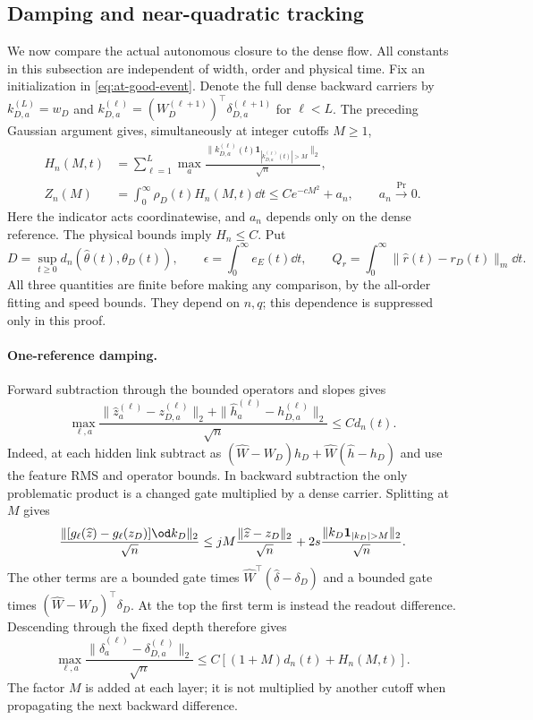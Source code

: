 \subsection{Damping and near-quadratic tracking}
\label{sec:at-tracking}

We now compare the actual autonomous closure to the dense flow.  All
constants in this subsection are independent of width, order and physical
time.  Fix an initialization in \eqref{eq:at-good-event}.  Denote the full
dense backward carriers by
$k^{(L)}_{D,a}=w_D$ and
$k^{(\ell)}_{D,a}=(W_D^{(\ell+1)})^\top\delta^{(\ell+1)}_{D,a}$
for $\ell<L$.  The preceding Gaussian argument gives, simultaneously at
integer cutoffs $M\ge1$,
\begin{align}
 H_n(M,t)&=\sum_{\ell=1}^L\max_a
 \frac{\|k^{(\ell)}_{D,a}(t)
                \mathbf1_{|k^{(\ell)}_{D,a}(t)|>M}\|_2}{\sqrt n},\nonumber\\
 Z_n(M)&=\int_0^\infty\rho_D(t)H_n(M,t)\dd t
       \le Ce^{-cM^2}+a_n,\qquad a_n\xrightarrow{\Pr}0.
 \label{eq:at-tracking-tail}
\end{align}
Here the indicator acts coordinatewise, and $a_n$ depends only on the dense
reference.  The physical bounds imply $H_n\le C$.  Put
\[
 D=\sup_{t\ge0}d_n(\widehat\theta(t),\theta_D(t)),\qquad
 \epsilon=\int_0^\infty e_E(t)\dd t,\qquad
 Q_r=\int_0^\infty\|\widehat r(t)-r_D(t)\|_m\dd t.
\]
All three quantities are finite before making any comparison, by the
all-order fitting and speed bounds.  They depend on $n,q$; this dependence
is suppressed only in this proof.

\paragraph{One-reference damping.}
Forward subtraction through the bounded operators and slopes gives
\[
 \max_{\ell,a}\frac{\|\widehat z_a^{(\ell)}-z_{D,a}^{(\ell)}\|_2
                 +\|\widehat h_a^{(\ell)}-h_{D,a}^{(\ell)}\|_2}{\sqrt n}
 \le C d_n(t).
\]
Indeed, at each hidden link subtract as
$(\widehat W-W_D)h_D+\widehat W(\widehat h-h_D)$ and use the feature
RMS and operator bounds.  In backward subtraction the only problematic
product is a changed gate multiplied by a dense carrier.  Splitting at $M$
gives
\begin{equation}
 \frac{\|[g_\ell(\widehat z)-g_\ell(z_D)]\od k_D\|_2}{\sqrt n}
 \le jM\frac{\|\widehat z-z_D\|_2}{\sqrt n}
       +2s\frac{\|k_D\mathbf1_{|k_D|>M}\|_2}{\sqrt n}.
 \label{eq:at-cutoff-product}
\end{equation}
The other terms are a bounded gate times
$\widehat W^\top(\widehat\delta-\delta_D)$ and a bounded gate times
$(\widehat W-W_D)^\top\delta_D$.  At the top the first term is instead
the readout difference.  Descending through the fixed depth therefore gives
\begin{equation}
 \max_{\ell,a}\frac{\|\widehat\delta_a^{(\ell)}
                       -\delta_{D,a}^{(\ell)}\|_2}{\sqrt n}
 \le C[(1+M)d_n(t)+H_n(M,t)].
 \label{eq:at-backward-difference}
\end{equation}
The factor $M$ is added at each layer; it is not multiplied by another
cutoff when propagating the next backward difference.

